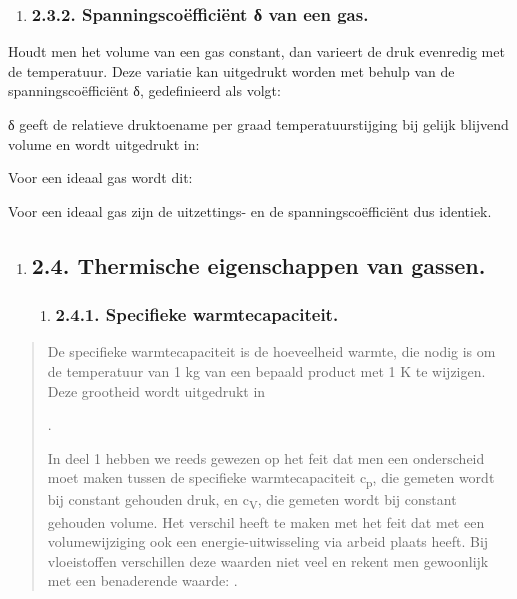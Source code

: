 \documentclass[]{article}
\begin{document}
\begin{enumerate}
\item
  \subsubsection{2.3.2. Spanningscoëfficiënt δ van een
  gas.}\label{spanningscouxebfficiuxebnt-ux3b4-van-een-gas.}
\end{enumerate}

Houdt men het volume van een gas constant, dan varieert de druk
evenredig met de temperatuur. Deze variatie kan uitgedrukt worden met
behulp van de spanningscoëfficiënt δ, gedefinieerd als volgt:

δ geeft de relatieve druktoename per graad temperatuurstijging bij
gelijk blijvend volume en wordt uitgedrukt in:

Voor een ideaal gas wordt dit:

Voor een ideaal gas zijn de uitzettings- en de spanningscoëfficiënt dus
identiek.

\begin{enumerate}
\item
  \subsection{2.4. Thermische eigenschappen van
  gassen.}\label{thermische-eigenschappen-van-gassen.}

  \begin{enumerate}
  \item
    \subsubsection{2.4.1. Specifieke
    warmtecapaciteit.}\label{specifieke-warmtecapaciteit.}
  \end{enumerate}
\end{enumerate}

\begin{quote}
De specifieke warmtecapaciteit is de hoeveelheid warmte, die nodig is om
de temperatuur van 1 kg van een bepaald product met 1 K te wijzigen.
Deze grootheid wordt uitgedrukt in

.

In deel 1 hebben we reeds gewezen op het feit dat men een onderscheid
moet maken tussen de specifieke warmtecapaciteit c\textsubscript{p}, die
gemeten wordt bij constant gehouden druk, en c\textsubscript{V}, die
gemeten wordt bij constant gehouden volume. Het verschil heeft te maken
met het feit dat met een volumewijziging ook een energie-uitwisseling
via arbeid plaats heeft. Bij vloeistoffen verschillen deze waarden niet
veel en rekent men gewoonlijk met een benaderende waarde: .
\end{quote}
\end{document}

